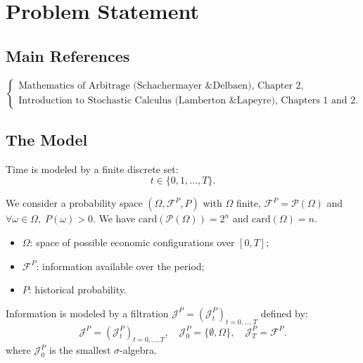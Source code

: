 \chapter{Problem Statement}

\section*{Main References}
\[
\begin{cases}
\text{Mathematics of Arbitrage (Schachermayer \& Delbaen), Chapter 2},\\[3pt]
\text{Introduction to Stochastic Calculus (Lamberton \& Lapeyre), Chapters 1 and 2.}
\end{cases}
\]

\section{The Model}

\begin{definition}
Time is modeled by a finite discrete set:
\begin{equation}
t \in \{0, 1, \ldots, T\}.
\end{equation}
\end{definition}

\begin{definition}
We consider a probability space $(\Omega, \mathcal{F}^{P}, P)$ with $\Omega$ finite, $\mathcal{F}^{P} = \mathcal{P}(\Omega)$ and $\forall \omega \in \Omega,\; P(\omega)>0$. We have $\text{card}(\mathcal{P}(\Omega)) = 2^n$ and $\text{card}(\Omega) = n$.
\end{definition}

\medskip
\begin{tcolorbox}[title=Intuitive Interpretation, colback=yellow!5!white, colframe=yellow!50!black]
\begin{itemize}
    \item $\Omega$: space of possible economic configurations over $[0,T]$;
    \item $\mathcal{F}^{P}$: information available over the period;
    \item $P$: historical probability.
\end{itemize}
\end{tcolorbox}

\begin{definition}[Filtration]
Information is modeled by a filtration $\mathcal{J}^{P} = (\mathcal{J}^{P}_{t})_{t=0,\ldots,T}$ defined by:
\begin{equation}
\mathcal{J}^{P} = (\mathcal{J}^{P}_{t})_{t=0,\ldots,T}, \quad \mathcal{J}^{P}_{0}=\{\emptyset,\Omega\}, \quad \mathcal{J}^{P}_{T}=\mathcal{F}^{P}.
\end{equation}
where $\mathcal{J}^{P}_{0}$ is the smallest $\sigma$-algebra.
\end{definition}

